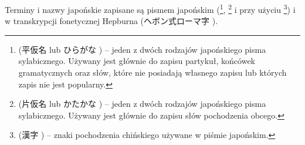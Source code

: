 Terminy i nazwy japońskie zapisane są pismem japońskim
(\footnote{ (平仮名 lub ひらがな )
-- jeden z dwóch rodzajów japońskiego pisma sylabicznego. Używany jest głównie do
zapisu partykuł, końcówek gramatycznych oraz słów, które nie posiadają
własnego zapisu  lub których zapis  nie jest
popularny.}, \footnote{ (片仮名 lub かたかな
) -- jeden z dwóch rodzajów japońskiego pisma sylabicznego.
Używany jest głównie do zapisu słów pochodzenia obcego.} i przy użyciu
\footnote{ (漢字 ) -- znaki pochodzenia
chińskiego używane w piśmie japońskim.})  i w
transkrypcji fonetycznej Hepburna (ヘボン式ローマ字 ).
